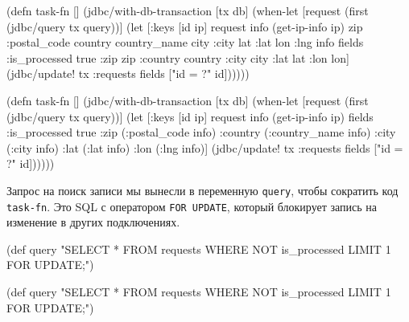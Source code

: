 \begin{english}
  \begin{clojure/lines}
(defn task-fn []
 (jdbc/with-db-transaction [tx db]
  (when-let [request
             (first
              (jdbc/query tx query))]
    (let [{:keys [id ip]} request
          info   (get-ip-info ip)
          {zip :postal_code
           country country_name
           city :city lat :lat
           lon :lng} info
          fields {:is_processed true
                  :zip zip
                  :country country
                  :city city
                  :lat lat
                  :lon lon}]
      (jdbc/update! tx :requests
        fields ["id = ?" id])))))
  \end{clojure/lines}
\end{english}

\else

\begin{english}
  \begin{clojure/lines}
(defn task-fn []
  (jdbc/with-db-transaction [tx db]
    (when-let [request (first (jdbc/query tx query))]
      (let [{:keys [id ip]} request
            info   (get-ip-info ip)
            fields {:is_processed true
                    :zip (:postal_code info)
                    :country (:country_name info)
                    :city (:city info)
                    :lat (:lat info)
                    :lon (:lng info)}]
        (jdbc/update! tx :requests
                      fields
                      ["id = ?" id])))))
  \end{clojure/lines}
\end{english}

\fi


Запрос на поиск записи мы вынесли в переменную \verb|query|, чтобы сократить
код \verb|task-fn|. Это SQL с оператором \verb|FOR UPDATE|, который
блокирует запись на изменение в других подключениях.

\ifx\DEVICETYPE\MOBILE

\begin{english}
  \begin{clojure}
(def query
  "SELECT * FROM requests
   WHERE NOT is_processed
   LIMIT 1 FOR UPDATE;")
  \end{clojure}
\end{english}

\else

\begin{english}
  \begin{clojure}
(def query
  "SELECT * FROM requests WHERE NOT is_processed
   LIMIT 1 FOR UPDATE;")
  \end{clojure}
\end{english}

